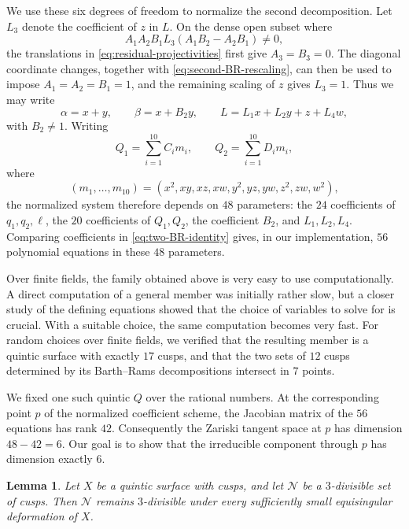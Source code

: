 \documentclass[10pt,a4paper]{article}
\newtheorem{lemma}[theorem]{Lemma}
\begin{document}
We use these six degrees of freedom to normalize the second decomposition.
Let $L_3$ denote the coefficient of $z$ in $L$.
On the dense open subset where
\[
 A_1A_2B_1L_3(A_1B_2-A_2B_1)\ne0,
\]
the translations in
\eqref{eq:residual-projectivities} first give
\(
        A_3=B_3=0
\).
The diagonal coordinate changes, together with
\eqref{eq:second-BR-rescaling}, can then be used to impose
\(
        A_1=A_2=B_1=1
\),
and the remaining scaling of $z$ gives $L_3=1$.  Thus we may write
\begin{equation}
 \label{eq:normalized-second-BR}
        \alpha=x+y,
        \qquad
        \beta=x+B_2y,
        \qquad
        L=L_1x+L_2y+z+L_4w,
\end{equation}
with $B_2\ne1$.  Writing
\[
 Q_1=\sum_{i=1}^{10}C_i m_i,
 \qquad
 Q_2=\sum_{i=1}^{10}D_i m_i,
\]
where
\[
 (m_1,\ldots,m_{10})=
 (x^2,xy,xz,xw,y^2,yz,yw,z^2,zw,w^2),
\]
the normalized system therefore depends on $48$ parameters: 
the $24$ coefficients of $q_1,q_2,\ell$, the $20$ coefficients
of $Q_1,Q_2$, the coefficient $B_2$, and $L_1,L_2,L_4$.  Comparing
coefficients in \eqref{eq:two-BR-identity} gives, in our implementation,
$56$ polynomial equations in these $48$ parameters.

Over finite fields, the family obtained above is very easy to use
computationally.  A direct computation of a general member was initially
rather slow, but a closer study of the defining equations showed that the
choice of variables to solve for is crucial.  With a suitable choice, the same
computation becomes very fast.  For random choices over finite fields, we
verified that the resulting member is a quintic surface with exactly $17$
cusps, and that the two sets of $12$ cusps determined by its Barth--Rams
decompositions intersect in $7$ points.

We fixed one such quintic $Q$ over the rational numbers.  
At the corresponding point $p$ of the normalized
coefficient scheme, the Jacobian matrix of the $56$ equations has rank
$42$.
Consequently the Zariski tangent space at $p$ has dimension
$48-42=6$.
Our goal is to show that the irreducible component through $p$ has dimension
exactly $6$.

\begin{lemma}
\label{lem:three-divisibility-deformation}
Let $X$ be a quintic surface with cusps, and let $\mathcal N$ be a
$3$-divisible set of cusps.  Then $\mathcal N$ remains $3$-divisible under
every sufficiently small equisingular deformation of $X$.
\end{lemma}
\end{document}
